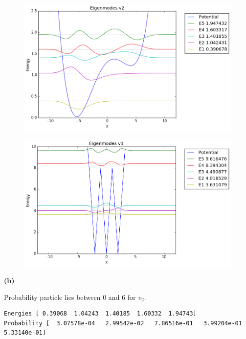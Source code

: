 \documentclass[11pt]{article}
\newcommand{\problem}{\medskip \noindent \textbf}
\begin{document}
\pagebreak

\begin{figure}[h!]
  \includegraphics[width=5.5in]{eigv2.png}
\end{figure}

\begin{figure}[h!]
  \includegraphics[width=5.5in]{eigv3.png}
\end{figure}

\problem{(b)}

Probability particle lies between 0 and 6 for $v_2$.
\begin{verbatim}
Energies [ 0.39068  1.04243  1.40185  1.60332  1.94743]
Probability [  3.07578e-04   2.99542e-02   7.86516e-01   3.99204e-01   5.33140e-01]
\end{verbatim}
\end{document}
